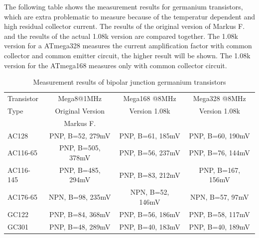 The following table shows the measurement results for germanium transistors, which are extra problematic
to measure because of the temperatur dependent and high residual collector current.
The results of the original version of Markus F. and the results of the actual 1.08k version are
compared together. The 1.08k version for a ATmega328 measures the current amplification factor with
common collector and common emitter circuit, the higher result will be shown.
The 1.08k version for the ATmega168 measures only with common collector circuit.

\begin{table}[H]
  \begin{center}
    \begin{tabular}{| l | c | c | c |}
    \hline
 Transistor & Mega8@1MHz          & Mega168 @8MHz       & Mega328 @8MHz    \\
    Type    & Original Version    & Version 1.08k       & Version 1.08k  \\
            & Markus F.           &                     &        \\
    \hline
    \hline
AC128       & PNP, B=52, 279mV    & PNP, B=61, 185mV    & PNP, B=60, 190mV    \\
    \hline
AC116-65    & PNP, B=505, 378mV   & PNP, B=56, 237mV    & PNP, B=76, 144mV    \\
    \hline
AC116-145   & PNP, B=485, 294mV   & PNP, B=83, 212mV    & PNP, B=167, 156mV   \\
    \hline
AC176-65    & NPN, B=98, 235mV    & NPN, B=52, 146mV    & NPN, B=57, 97mV     \\
    \hline
GC122       & PNP, B=84, 368mV    & PNP, B=56, 186mV    & PNP, B=58, 117mV    \\
    \hline
GC301       & PNP, B=48, 289mV    & PNP, B=40, 183mV    & PNP, B=40, 189mV    \\
    \hline
    \end{tabular}
  \end{center}
  \caption{Measurement results of bipolar junction germanium transistors}
  \label{tab:germanium}
\end{table}




